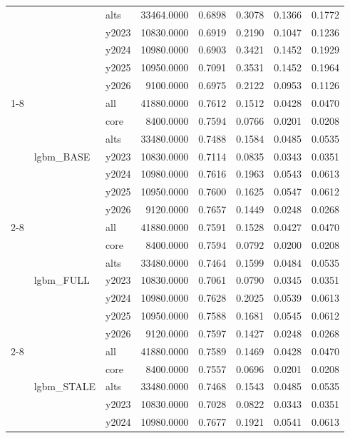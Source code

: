 \begin{tabular}{lllrrrrr}
 &  & alts & 33464.0000 & 0.6898 & 0.3078 & 0.1366 & 0.1772 \\
 &  & y2023 & 10830.0000 & 0.6919 & 0.2190 & 0.1047 & 0.1236 \\
 &  & y2024 & 10980.0000 & 0.6903 & 0.3421 & 0.1452 & 0.1929 \\
 &  & y2025 & 10950.0000 & 0.7091 & 0.3531 & 0.1452 & 0.1964 \\
 &  & y2026 & 9100.0000 & 0.6975 & 0.2122 & 0.0953 & 0.1126 \\
\cline{1-8} \cline{2-8}
\multirow[t]{42}{*}{dd5_8h} & \multirow[t]{7}{*}{lgbm_BASE} & all & 41880.0000 & 0.7612 & 0.1512 & 0.0428 & 0.0470 \\
 &  & core & 8400.0000 & 0.7594 & 0.0766 & 0.0201 & 0.0208 \\
 &  & alts & 33480.0000 & 0.7488 & 0.1584 & 0.0485 & 0.0535 \\
 &  & y2023 & 10830.0000 & 0.7114 & 0.0835 & 0.0343 & 0.0351 \\
 &  & y2024 & 10980.0000 & 0.7616 & 0.1963 & 0.0543 & 0.0613 \\
 &  & y2025 & 10950.0000 & 0.7600 & 0.1625 & 0.0547 & 0.0612 \\
 &  & y2026 & 9120.0000 & 0.7657 & 0.1449 & 0.0248 & 0.0268 \\
\cline{2-8}
 & \multirow[t]{7}{*}{lgbm_FULL} & all & 41880.0000 & 0.7591 & 0.1528 & 0.0427 & 0.0470 \\
 &  & core & 8400.0000 & 0.7594 & 0.0792 & 0.0200 & 0.0208 \\
 &  & alts & 33480.0000 & 0.7464 & 0.1599 & 0.0484 & 0.0535 \\
 &  & y2023 & 10830.0000 & 0.7061 & 0.0790 & 0.0345 & 0.0351 \\
 &  & y2024 & 10980.0000 & 0.7628 & 0.2025 & 0.0539 & 0.0613 \\
 &  & y2025 & 10950.0000 & 0.7588 & 0.1681 & 0.0545 & 0.0612 \\
 &  & y2026 & 9120.0000 & 0.7597 & 0.1427 & 0.0248 & 0.0268 \\
\cline{2-8}
 & \multirow[t]{7}{*}{lgbm_STALE} & all & 41880.0000 & 0.7589 & 0.1469 & 0.0428 & 0.0470 \\
 &  & core & 8400.0000 & 0.7557 & 0.0696 & 0.0201 & 0.0208 \\
 &  & alts & 33480.0000 & 0.7468 & 0.1543 & 0.0485 & 0.0535 \\
 &  & y2023 & 10830.0000 & 0.7028 & 0.0822 & 0.0343 & 0.0351 \\
 &  & y2024 & 10980.0000 & 0.7677 & 0.1921 & 0.0541 & 0.0613 \\

\end{tabular}
